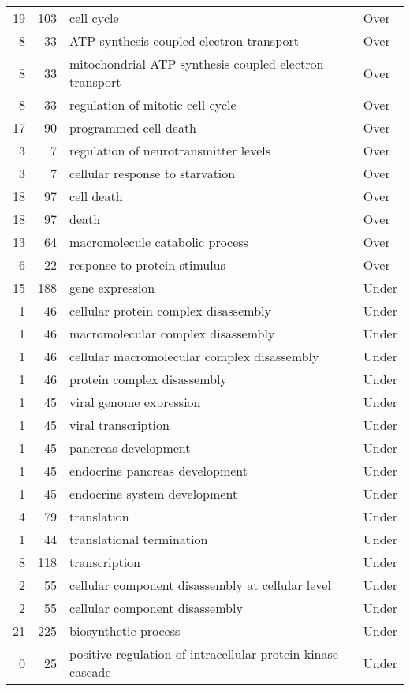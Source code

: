 \documentclass[10pt]{bmc_article}
\newenvironment{bmcformat}{\begin{raggedright}\baselineskip20pt\sloppy\setboolean{publ}{false}}{\end{raggedright}\baselineskip20pt\sloppy}
\begin{document}
\begin{bmcformat}
\begin{longtable}{rrll}
   19 & 103 & cell cycle & Over \\ 
    8 &  33 & ATP synthesis coupled electron transport & Over \\ 
    8 &  33 & mitochondrial ATP synthesis coupled electron transport & Over \\ 
    8 &  33 & regulation of mitotic cell cycle & Over \\ 
   17 &  90 & programmed cell death & Over \\ 
    3 &   7 & regulation of neurotransmitter levels & Over \\ 
    3 &   7 & cellular response to starvation & Over \\ 
   18 &  97 & cell death & Over \\ 
   18 &  97 & death & Over \\ 
   13 &  64 & macromolecule catabolic process & Over \\ 
    6 &  22 & response to protein stimulus & Over \\ 
   15 & 188 & gene expression & Under \\ 
    1 &  46 & cellular protein complex disassembly & Under \\ 
    1 &  46 & macromolecular complex disassembly & Under \\ 
    1 &  46 & cellular macromolecular complex disassembly & Under \\ 
    1 &  46 & protein complex disassembly & Under \\ 
    1 &  45 & viral genome expression & Under \\ 
    1 &  45 & viral transcription & Under \\ 
    1 &  45 & pancreas development & Under \\ 
    1 &  45 & endocrine pancreas development & Under \\ 
    1 &  45 & endocrine system development & Under \\ 
    4 &  79 & translation & Under \\ 
    1 &  44 & translational termination & Under \\ 
    8 & 118 & transcription & Under \\ 
    2 &  55 & cellular component disassembly at cellular level & Under \\ 
    2 &  55 & cellular component disassembly & Under \\ 
   21 & 225 & biosynthetic process & Under \\ 
    0 &  25 & positive regulation of intracellular protein kinase cascade & Under \\ 

\end{longtable}
\end{bmcformat}
\end{document}
